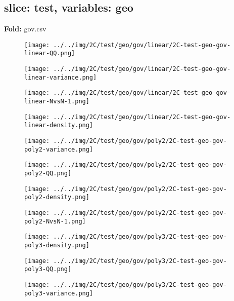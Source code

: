 \subsection{slice: test, variables: geo}
\textbf{Fold:} gov.csv
\begin{figure}[H]
\centering	\texttt{[image: ../../img/2C/test/geo/gov/linear/2C-test-geo-gov-linear-QQ.png]}
\end{figure}
\begin{figure}[H]
\centering	\texttt{[image: ../../img/2C/test/geo/gov/linear/2C-test-geo-gov-linear-variance.png]}
\end{figure}
\begin{figure}[H]
\centering	\texttt{[image: ../../img/2C/test/geo/gov/linear/2C-test-geo-gov-linear-NvsN-1.png]}
\end{figure}
\begin{figure}[H]
\centering	\texttt{[image: ../../img/2C/test/geo/gov/linear/2C-test-geo-gov-linear-density.png]}
\end{figure}
\begin{figure}[H]
\centering	\texttt{[image: ../../img/2C/test/geo/gov/poly2/2C-test-geo-gov-poly2-variance.png]}
\end{figure}
\begin{figure}[H]
\centering	\texttt{[image: ../../img/2C/test/geo/gov/poly2/2C-test-geo-gov-poly2-QQ.png]}
\end{figure}
\begin{figure}[H]
\centering	\texttt{[image: ../../img/2C/test/geo/gov/poly2/2C-test-geo-gov-poly2-density.png]}
\end{figure}
\begin{figure}[H]
\centering	\texttt{[image: ../../img/2C/test/geo/gov/poly2/2C-test-geo-gov-poly2-NvsN-1.png]}
\end{figure}
\begin{figure}[H]
\centering	\texttt{[image: ../../img/2C/test/geo/gov/poly3/2C-test-geo-gov-poly3-density.png]}
\end{figure}
\begin{figure}[H]
\centering	\texttt{[image: ../../img/2C/test/geo/gov/poly3/2C-test-geo-gov-poly3-QQ.png]}
\end{figure}
\begin{figure}[H]
\centering	\texttt{[image: ../../img/2C/test/geo/gov/poly3/2C-test-geo-gov-poly3-variance.png]}
\end{figure}
